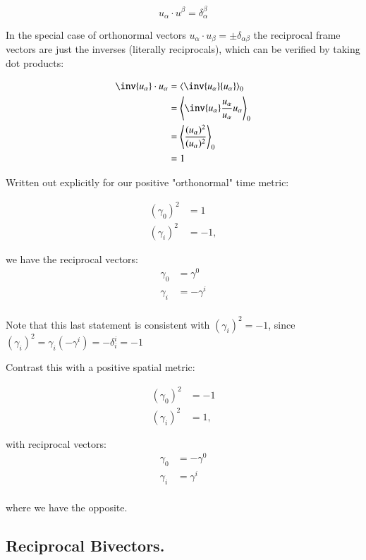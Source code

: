 \documentclass{article}
\newcommand{\gpgrade}[2] {{\left\langle{{#1}}\right\rangle}_{#2}}
\newcommand{\gpgradezero}[1] {\gpgrade{#1}{0}}
\begin{document}
\begin{equation*}
u_{\alpha} \cdot u^{\beta} = \delta_{\alpha}^\beta
\end{equation*}

In the special case of orthonormal vectors $u_{\alpha} \cdot u_{\beta} = \pm \delta_{\alpha\beta}$ the reciprocal frame vectors
are just the inverses (literally reciprocals), which can be verified by taking dot products:

\begin{align*}
\inv{u_{\alpha}} \cdot {u_{\alpha}}
&= \gpgradezero{ \inv{u_{\alpha}} {u_{\alpha}} } \\
&= \gpgradezero{ \inv{u_{\alpha}} \frac{u_{\alpha}}{u_{\alpha}} {u_{\alpha}} } \\
&= \gpgradezero{ \frac{(u_{\alpha})^2}{(u_{\alpha})^2} } \\
&= 1
\end{align*}

Written out explicitly for our positive "orthonormal" time metric:

\begin{align*}
(\gamma_0)^2 &= 1 \\
(\gamma_i)^2 &= -1,
\end{align*}

we have the reciprocal vectors:
\begin{align*}
\gamma_0 &= \gamma^0 \\
\gamma_i &= -\gamma^i \\
\end{align*}

Note that this last statement is consistent with $(\gamma_i)^2 = -1$, since $(\gamma_i)^2 = \gamma_i (-\gamma^i) = -\delta_i^i = -1$

Contrast this with a positive spatial metric:

\begin{align*}
(\gamma_0)^2 &= -1 \\
(\gamma_i)^2 &= 1,
\end{align*}

with reciprocal vectors:
\begin{align*}
\gamma_0 &= -\gamma^0 \\
\gamma_i &= \gamma^i \\
\end{align*}

where we have the opposite.

\subsection{ Reciprocal Bivectors. }
\end{document}
